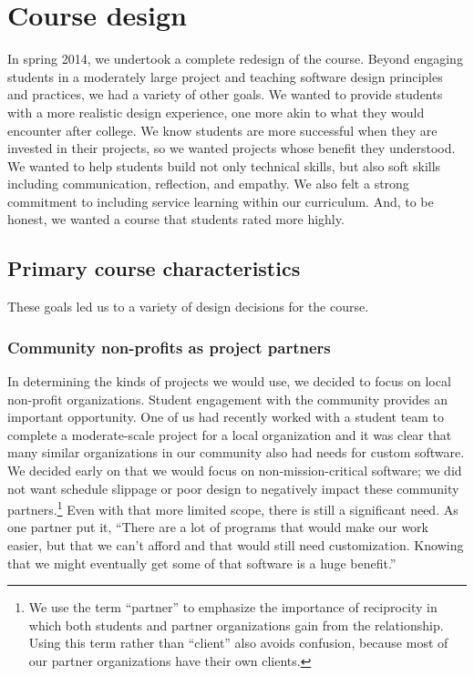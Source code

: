 \section{Course design}


In spring 2014, we undertook a complete redesign of the course.
Beyond engaging students in a moderately large project and teaching
software design principles and practices, we had a variety of other
goals.  We wanted to provide students with a more realistic design
experience, one more akin to what they would encounter after college.
We know students are more successful when they are invested in their
projects, so we wanted projects whose benefit they understood.  We
wanted to help students build not only technical skills, but also
soft skills including communication, reflection, and empathy.  
We also felt a strong commitment to
including service learning within our curriculum.  And, to be
honest, we wanted a course that students rated more highly.

\subsection{Primary course characteristics}

These goals led us to a variety of design decisions for the course.

\subsubsection{Community non-profits as project partners}

In determining the kinds of projects we would use, we decided to
focus on local non-profit organizations.  Student engagement with
the community provides an important opportunity.  One of us had
recently worked with a student team to complete a moderate-scale
project for a local organization and it was clear that many similar
organizations in our community also had needs for custom software.
We decided early on that we would focus on non-mission-critical
software; we did not want schedule slippage or poor design to
negatively impact these community partners.\footnote{We use the term ``partner'' to emphasize the importance of
reciprocity in which both students and partner organizations gain
from the relationship.  Using this term rather than ``client'' also
avoids confusion, because most of our partner organizations have
their own clients.} Even with that more limited scope, there is
still a significant need.  As one partner put it, ``There are a lot
of programs that would make our work easier, but that we can't
afford and that would still need customization.  Knowing that we
might eventually get some of that software is a huge benefit.''


